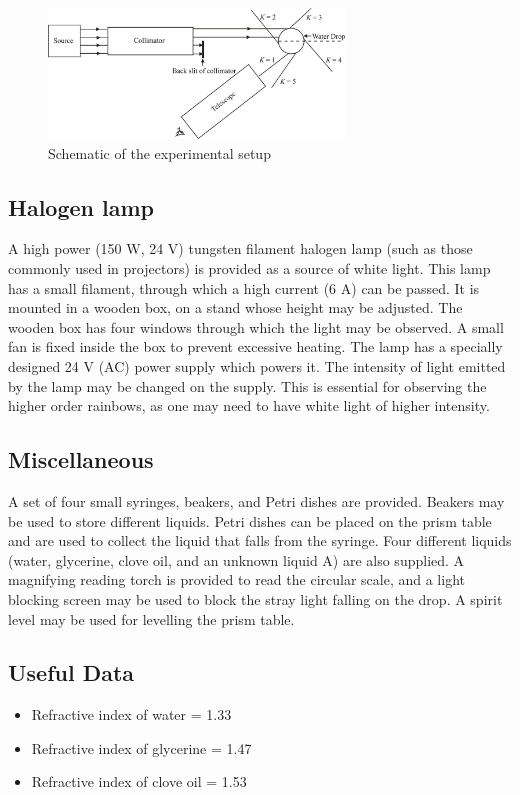 \begin{figure}[!htb]
    \centering
    \includegraphics[width=0.70\textwidth]{figs/img2.jpg}
    \caption{Schematic of the experimental setup}
    \label{fig:experimentalsetup}
\end{figure}

\subsection*{Halogen lamp}

A high power (150 W, 24 V) tungsten filament halogen lamp (such as those commonly used in projectors) is provided as a source of white light. This lamp has a small filament, through which a high current (6 A) can be passed. It is mounted in a wooden box, on a stand whose height may be adjusted. The wooden box has four windows through which the light may be observed. A small fan is fixed inside the box to prevent excessive heating. The lamp has a specially designed 24 V (AC) power supply which powers it. The intensity of light emitted by the lamp may be changed on the supply. This is essential for observing the higher order rainbows, as one may need to have white light of higher intensity.

\subsection*{Miscellaneous}
A set of four small syringes, beakers, and Petri dishes are provided. Beakers may be used to store different liquids. Petri dishes can be placed on the prism table and are used to collect the liquid that falls from the syringe. Four different liquids (water, glycerine, clove oil, and an unknown liquid A) are also supplied. A magnifying reading torch is provided to read the circular scale, and a light blocking screen may be used to block the stray light falling on the drop. A spirit level may be used for levelling the prism table.

\subsection*{Useful Data}
\begin{itemize}
    \item Refractive index of water = 1.33
    \item Refractive index of glycerine = 1.47
    \item Refractive index of clove oil = 1.53
\end{itemize}

